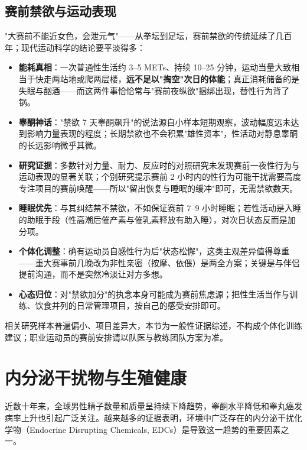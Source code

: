 \documentclass[12pt,a4paper,twoside]{ctexbook}
\begin{document}
\subsection{赛前禁欲与运动表现}

"大赛前不能近女色，会泄元气"——从拳坛到足坛，赛前禁欲的传统延续了几百年；现代运动科学的结论要平淡得多：

\begin{itemize}[leftmargin=2cm]
	\item \textbf{能耗真相}：一次普通性生活约 3--5 METs、持续 10--25 分钟，运动当量大致相当于快走两站地或爬两层楼，\textbf{远不足以"掏空"次日的体能}；真正消耗储备的是失眠与酗酒——而这两件事恰恰常与"赛前夜纵欲"捆绑出现，替性行为背了锅。
	\item \textbf{睾酮神话}："禁欲 7 天睾酮飙升"的说法源自小样本短期观察，波动幅度远未达到影响力量表现的程度；长期禁欲也不会积累"雄性资本"，性活动对静息睾酮的长远影响微乎其微。
	\item \textbf{研究证据}：多数针对力量、耐力、反应时的对照研究未发现赛前一夜性行为与运动表现的显著关联；个别研究提示赛前 2 小时内的性行为可能干扰需要高度专注项目的赛前唤醒——所以"留出恢复与睡眠的缓冲"即可，无需禁欲数天。
	\item \textbf{睡眠优先}：与其纠结禁不禁欲，不如保证赛前 7--9 小时睡眠；若性活动是入睡的助眠手段（性高潮后催产素与催乳素释放有助入睡），对次日状态反而是加分项。
	\item \textbf{个体化调整}：确有运动员自感性行为后"状态松懈"，这类主观差异值得尊重——重大赛事前几晚改为非性亲密（按摩、依偎）是两全方案；关键是与伴侣提前沟通，而不是突然冷淡让对方多想。
	\item \textbf{心态归位}：对"禁欲加分"的执念本身可能成为赛前焦虑源；把性生活当作与训练、饮食并列的日常管理项目，按自己的感受安排即可。
\end{itemize}

\begin{tcolorbox}[colback=pink!5!white,colframe=red!50!black,title=贴心小叮咛]
相关研究样本普遍偏小、项目差异大，本节为一般性证据综述，不构成个体化训练建议；职业运动员的赛前安排请以队医与教练团队方案为准。
\end{tcolorbox}

\section{内分泌干扰物与生殖健康}


近数十年来，全球男性精子数量和质量呈持续下降趋势，睾酮水平降低和睾丸癌发病率上升也引起广泛关注。越来越多的证据表明，环境中广泛存在的内分泌干扰化学物（Endocrine Disrupting Chemicals, EDCs）是导致这一趋势的重要因素之一。
\end{document}
